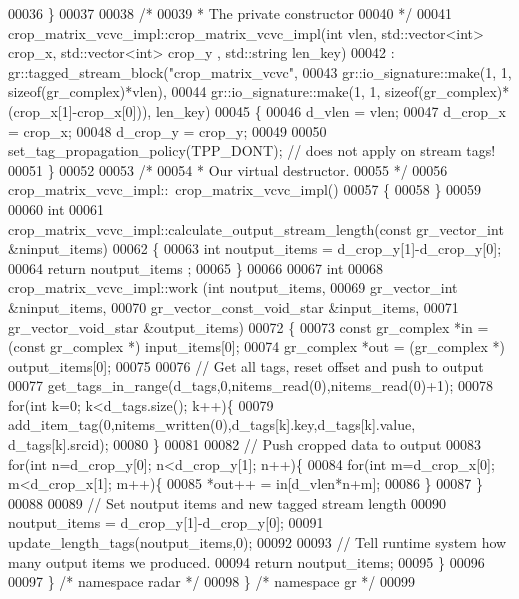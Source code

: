 \begin{DoxyCode}
00036     \}
00037 
00038     \textcolor{comment}{/*}
00039 \textcolor{comment}{     * The private constructor}
00040 \textcolor{comment}{     */}
00041     crop_matrix_vcvc_impl::crop_matrix_vcvc_impl(\textcolor{keywordtype}{int} vlen, std::vector<int> crop\_x, std::vector<int> crop\_y
      , std::string len\_key)
00042       : gr::tagged\_stream\_block(\textcolor{stringliteral}{"crop\_matrix\_vcvc"},
00043               gr::io\_signature::make(1, 1, sizeof(gr\_complex)*vlen),
00044               gr::io\_signature::make(1, 1, sizeof(gr\_complex)*(crop\_x[1]-crop\_x[0])), len\_key)
00045     \{
00046         d_vlen = vlen;
00047         d_crop_x = crop\_x;
00048         d_crop_y = crop\_y;
00049         
00050         set\_tag\_propagation\_policy(TPP\_DONT); \textcolor{comment}{// does not apply on stream tags!}
00051     \}
00052 
00053     \textcolor{comment}{/*}
00054 \textcolor{comment}{     * Our virtual destructor.}
00055 \textcolor{comment}{     */}
00056     crop_matrix_vcvc_impl::~crop_matrix_vcvc_impl()
00057     \{
00058     \}
00059 
00060     \textcolor{keywordtype}{int}
00061     crop_matrix_vcvc_impl::calculate_output_stream_length(\textcolor{keyword}{const} gr\_vector\_int &ninput\_items)
00062     \{
00063       \textcolor{keywordtype}{int} noutput\_items = d_crop_y[1]-d_crop_y[0];
00064       \textcolor{keywordflow}{return} noutput\_items ;
00065     \}
00066 
00067     \textcolor{keywordtype}{int}
00068     crop_matrix_vcvc_impl::work (\textcolor{keywordtype}{int} noutput\_items,
00069                        gr\_vector\_int &ninput\_items,
00070                        gr\_vector\_const\_void\_star &input\_items,
00071                        gr\_vector\_void\_star &output\_items)
00072     \{
00073         \textcolor{keyword}{const} gr\_complex *in = (\textcolor{keyword}{const} gr\_complex *) input\_items[0];
00074         gr\_complex *out = (gr\_complex *) output\_items[0];
00075         
00076         \textcolor{comment}{// Get all tags, reset offset and push to output}
00077         get\_tags\_in\_range(d_tags,0,nitems\_read(0),nitems\_read(0)+1);
00078         \textcolor{keywordflow}{for}(\textcolor{keywordtype}{int} k=0; k<d_tags.size(); k++)\{
00079             add\_item\_tag(0,nitems\_written(0),d_tags[k].key,d_tags[k].value,
      d_tags[k].srcid);
00080         \}
00081 
00082         \textcolor{comment}{// Push cropped data to output}
00083         \textcolor{keywordflow}{for}(\textcolor{keywordtype}{int} n=d_crop_y[0]; n<d_crop_y[1]; n++)\{
00084             \textcolor{keywordflow}{for}(\textcolor{keywordtype}{int} m=d_crop_x[0]; m<d_crop_x[1]; m++)\{
00085                 *out++ = in[d_vlen*n+m];
00086             \}
00087         \}
00088         
00089         \textcolor{comment}{// Set noutput items and new tagged stream length}
00090         noutput\_items = d\_crop\_y[1]-d\_crop\_y[0];
00091         update\_length\_tags(noutput\_items,0);
00092 
00093         \textcolor{comment}{// Tell runtime system how many output items we produced.}
00094         \textcolor{keywordflow}{return} noutput\_items;
00095     \}
00096 
00097   \} \textcolor{comment}{/* namespace radar */}
00098 \} \textcolor{comment}{/* namespace gr */}
00099 
\end{DoxyCode}
